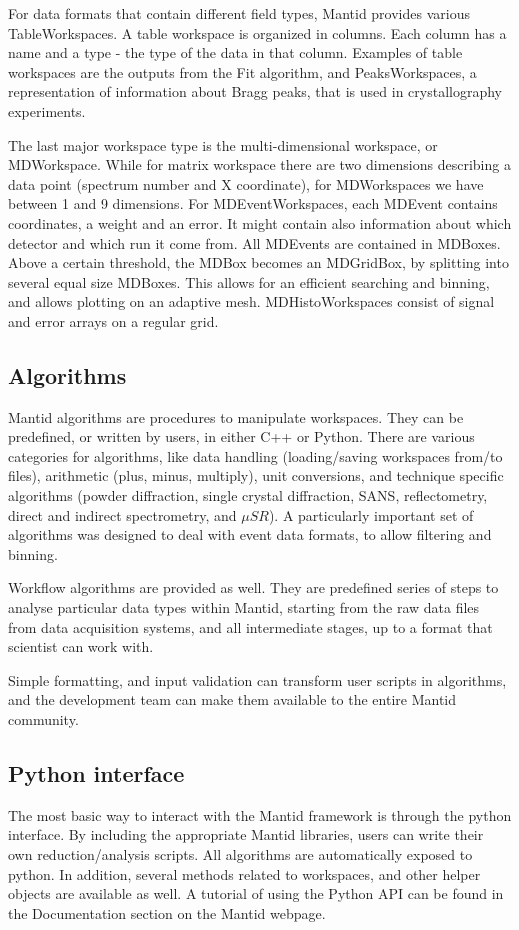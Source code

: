 \documentclass{elsarticle}
\begin{document}
For data formats that contain different field types, Mantid provides various TableWorkspaces. A table workspace is organized in columns. Each column has a name and a type - the type of the data in that column. Examples of table workspaces are the outputs from the Fit algorithm, and PeaksWorkspaces, a representation of information about Bragg peaks, that is used in crystallography experiments.
 
The last major workspace type is the multi-dimensional workspace, or MDWorkspace. While for matrix workspace there are two dimensions describing a data point (spectrum number and X coordinate), for MDWorkspaces we have between 1 and 9 dimensions. For MDEventWorkspaces, each MDEvent contains coordinates, a weight and an error. It might contain also information about which detector and which run it come from. All MDEvents are contained in MDBoxes. Above a certain threshold, the MDBox becomes an MDGridBox, by splitting into several equal size MDBoxes. This allows for an efficient searching and binning, and allows plotting on an adaptive mesh. MDHistoWorkspaces consist of signal and error arrays on a regular grid.  

\subsection{Algorithms}
Mantid algorithms are procedures to manipulate workspaces. They can be predefined, or written by users, in either C++ or Python. There are various categories for algorithms, like data handling (loading/saving workspaces from/to files), arithmetic (plus, minus, multiply), unit conversions, and technique specific algorithms (powder diffraction, single crystal diffraction, SANS, reflectometry, direct and indirect spectrometry, and $\mu SR$). A particularly important set of algorithms was designed to deal with event data formats, to allow filtering and binning.

Workflow algorithms are provided as well. They are predefined series of steps to analyse particular data types within Mantid, starting from the raw data files from data acquisition systems, and all intermediate stages, up to a format that scientist can work with. 

Simple formatting, and input validation can transform user scripts in algorithms, and the development team can make them available to the entire Mantid community. 


\subsection{Python interface}
The most basic way to interact with the Mantid framework is through the python interface. By including the appropriate Mantid libraries, users can write their own reduction/analysis scripts. All algorithms are automatically exposed to python. In addition, several methods related to workspaces, and other helper objects are available as well. A tutorial of using the Python API can be found in the Documentation section on the Mantid webpage\cite{webpage}.  
\end{document}
